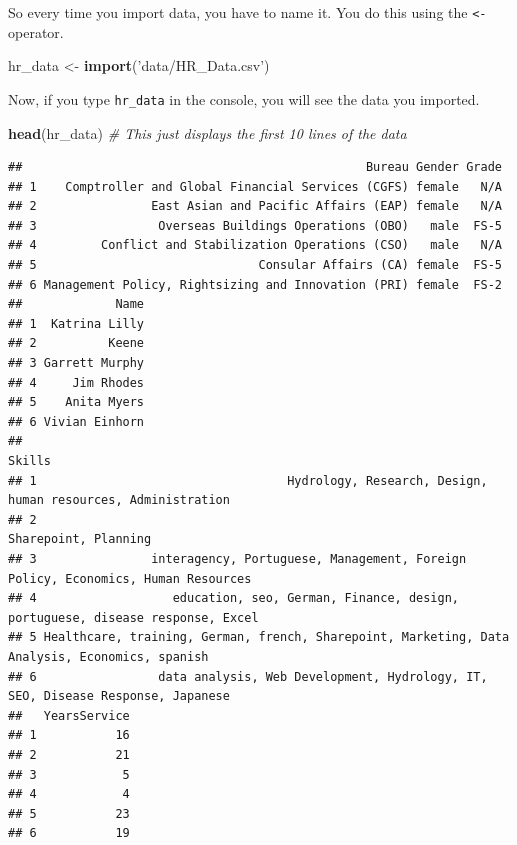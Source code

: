 \documentclass[12pt,letterpaperpaper,openany]{book}
\newenvironment{Shaded}{\begin{snugshade}}{\end{snugshade}}
\newcommand{\CommentTok}[1]{\textcolor[rgb]{0.56,0.35,0.01}{\textit{#1}}}
\newcommand{\KeywordTok}[1]{\textcolor[rgb]{0.13,0.29,0.53}{\textbf{#1}}}
\newcommand{\NormalTok}[1]{#1}
\newcommand{\StringTok}[1]{\textcolor[rgb]{0.31,0.60,0.02}{#1}}
\begin{document}
So every time you import data, you have to name it. You do this using the \texttt{\textless{}-} operator.

\begin{Shaded}
\begin{Highlighting}[]
\NormalTok{hr_data <-}\StringTok{ }\KeywordTok{import}\NormalTok{(}\StringTok{'data/HR_Data.csv'}\NormalTok{)}
\end{Highlighting}
\end{Shaded}

Now, if you type \texttt{hr\_data} in the console, you will see the data you imported.

\begin{Shaded}
\begin{Highlighting}[]
\KeywordTok{head}\NormalTok{(hr_data) }\CommentTok{# This just displays the first 10 lines of the data}
\end{Highlighting}
\end{Shaded}

\begin{verbatim}
##                                                Bureau Gender Grade
## 1    Comptroller and Global Financial Services (CGFS) female   N/A
## 2                East Asian and Pacific Affairs (EAP) female   N/A
## 3                 Overseas Buildings Operations (OBO)   male  FS-5
## 4         Conflict and Stabilization Operations (CSO)   male   N/A
## 5                               Consular Affairs (CA) female  FS-5
## 6 Management Policy, Rightsizing and Innovation (PRI) female  FS-2
##             Name
## 1  Katrina Lilly
## 2          Keene
## 3 Garrett Murphy
## 4     Jim Rhodes
## 5    Anita Myers
## 6 Vivian Einhorn
##                                                                                           Skills
## 1                                   Hydrology, Research, Design, human resources, Administration
## 2                                                                           Sharepoint, Planning
## 3                interagency, Portuguese, Management, Foreign Policy, Economics, Human Resources
## 4                   education, seo, German, Finance, design, portuguese, disease response, Excel
## 5 Healthcare, training, German, french, Sharepoint, Marketing, Data Analysis, Economics, spanish
## 6                 data analysis, Web Development, Hydrology, IT, SEO, Disease Response, Japanese
##   YearsService
## 1           16
## 2           21
## 3            5
## 4            4
## 5           23
## 6           19
\end{verbatim}
\end{document}
